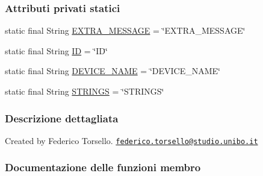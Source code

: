 \subsubsection*{Attributi privati statici}
\begin{DoxyCompactItemize}
\item 
static final String \hyperlink{classit_1_1unibo_1_1torsello_1_1bluetoothpositioning_1_1fragment_1_1DeviceChartFragment_a28ddce9b6c06c183ca8a3717e51d6339_a28ddce9b6c06c183ca8a3717e51d6339}{E\+X\+T\+R\+A\+\_\+\+M\+E\+S\+S\+A\+GE} = \char`\"{}E\+X\+T\+R\+A\+\_\+\+M\+E\+S\+S\+A\+GE\char`\"{}
\item 
static final String \hyperlink{classit_1_1unibo_1_1torsello_1_1bluetoothpositioning_1_1fragment_1_1DeviceChartFragment_a4f077af11a4bef4240a1fe8e2185c20e_a4f077af11a4bef4240a1fe8e2185c20e}{ID} = \char`\"{}ID\char`\"{}
\item 
static final String \hyperlink{classit_1_1unibo_1_1torsello_1_1bluetoothpositioning_1_1fragment_1_1DeviceChartFragment_a9313a4d6f386037e62d95d535b379ab2_a9313a4d6f386037e62d95d535b379ab2}{D\+E\+V\+I\+C\+E\+\_\+\+N\+A\+ME} = \char`\"{}D\+E\+V\+I\+C\+E\+\_\+\+N\+A\+ME\char`\"{}
\item 
static final String \hyperlink{classit_1_1unibo_1_1torsello_1_1bluetoothpositioning_1_1fragment_1_1DeviceChartFragment_a2be86b68a5ce90a3ba90b7a214ac47c0_a2be86b68a5ce90a3ba90b7a214ac47c0}{S\+T\+R\+I\+N\+GS} = \char`\"{}S\+T\+R\+I\+N\+GS\char`\"{}
\end{DoxyCompactItemize}


\subsubsection{Descrizione dettagliata}
Created by Federico Torsello. \href{mailto:federico.torsello@studio.unibo.it}{\tt federico.\+torsello@studio.\+unibo.\+it} 

\subsubsection{Documentazione delle funzioni membro}
\hypertarget{classit_1_1unibo_1_1torsello_1_1bluetoothpositioning_1_1fragment_1_1DeviceChartFragment_a16fb051f584eb5fd324e25ce67cc6730_a16fb051f584eb5fd324e25ce67cc6730}{}\label{classit_1_1unibo_1_1torsello_1_1bluetoothpositioning_1_1fragment_1_1DeviceChartFragment_a16fb051f584eb5fd324e25ce67cc6730_a16fb051f584eb5fd324e25ce67cc6730} 
